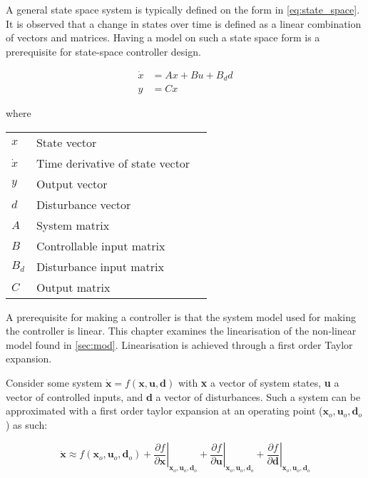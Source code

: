 A general state space system is typically defined on the form in \cref{eq:state_space}. It is observed that a change in states over time is defined as a linear combination of vectors and matrices. Having a model on such a state space form is a prerequisite for state-space controller design.

\begin{equation} \label{eq:state_space}
	\begin{split}
		\dot{x} & = Ax + Bu + B_dd \\
		y 		& = Cx
	\end{split}
\end{equation}

where


\begin{center}
	\begin{tabular}{l p{8cm} l}
		$x$       & State vector                    &  \\
		$\dot{x}$ & Time derivative of state vector &  \\
		$y$       & Output vector                   &  \\
		$d$       & Disturbance vector              &  \\
		$A$       & System matrix                   &  \\
		$B$       & Controllable input matrix       &  \\
		$B_d$     & Disturbance input matrix        &  \\
		$C$       & Output matrix                   &
	\end{tabular}
\end{center}

A prerequisite for making a controller is that the system model used for making the controller is linear. This chapter examines the linearisation of the non-linear model found in \cref{sec:mod}. Linearisation is achieved through a first order Taylor expansion.

Consider some system $\dot{\textbf{x}} = f(\textbf{x},\textbf{u},\textbf{d})$ with \textbf{x} a vector of system states, \textbf{u} a vector of controlled inputs, and \textbf{d} a vector of disturbances. Such a system can be approximated with a first order taylor expansion at an operating point ($\textbf{x}_o, \textbf{u}_o, \textbf{d}_o$) as such:




\begin{equation} \label{eq:taylor}
	\dot{\textbf{x}}   \approx   f(\textbf{x}_o, \textbf{u}_o, \textbf{d}_o)   +   \left. \dfrac{\partial f}{\partial \textbf{x}} \right |_{\textbf{x}_o, \textbf{u}_o, \textbf{d}_o} + \left. \dfrac{\partial f}{\partial \textbf{u}} \right |_{\textbf{x}_o, \textbf{u}_o, \textbf{d}_o} + \left. \dfrac{\partial f}{\partial \textbf{d}} \right |_{\textbf{x}_o, \textbf{u}_o, \textbf{d}_o}
\end{equation}


